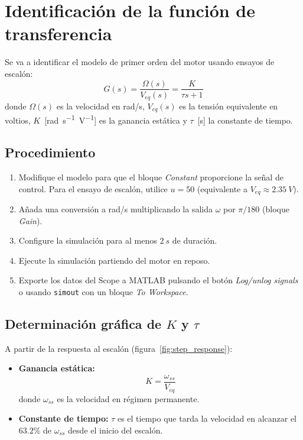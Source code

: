 \documentclass[12pt,a4paper]{article}
\begin{document}
\section{Identificación de la función de transferencia}

Se va a identificar el modelo de primer orden del motor usando ensayos de escalón:
\begin{equation}
  G(s) = \frac{\Omega(s)}{V_{eq}(s)} = \frac{K}{\tau s + 1}
  \label{eq:tf}
\end{equation}
donde $\Omega(s)$ es la velocidad en rad/s, $V_{eq}(s)$ es la tensión equivalente
en voltios, $K$~[\si{rad.s^{-1}.V^{-1}}] es la ganancia estática y $\tau$~[\si{s}]
la constante de tiempo.

\subsection{Procedimiento}

\begin{enumerate}
  \item Modifique el modelo para que el bloque \emph{Constant} proporcione la
        señal de control. Para el ensayo de escalón, utilice $u = 50$
        (equivalente a $V_{eq} \approx \SI{2.35}{V}$).
  \item Añada una conversión a rad/s multiplicando la salida $\omega$ por
        $\pi/180$ (bloque \emph{Gain}).
  \item Configure la simulación para al menos $\SI{2}{s}$ de duración.
  \item Ejecute la simulación partiendo del motor en reposo.
  \item Exporte los datos del Scope a MATLAB pulsando el botón
        \emph{Log/unlog signals} o usando \texttt{simout} con un bloque
        \emph{To Workspace}.
\end{enumerate}

\subsection{Determinación gráfica de $K$ y $\tau$}

A partir de la respuesta al escalón (figura~\ref{fig:step_response}):

\begin{itemize}[noitemsep]
  \item \textbf{Ganancia estática:}
        \begin{equation}
          K = \frac{\omega_{ss}}{V_{eq}}
          \label{eq:K}
        \end{equation}
        donde $\omega_{ss}$ es la velocidad en régimen permanente.
  \item \textbf{Constante de tiempo:}
        $\tau$ es el tiempo que tarda la velocidad en alcanzar
        el $63.2\%$ de $\omega_{ss}$ desde el inicio del escalón.
\end{itemize}
\end{document}
